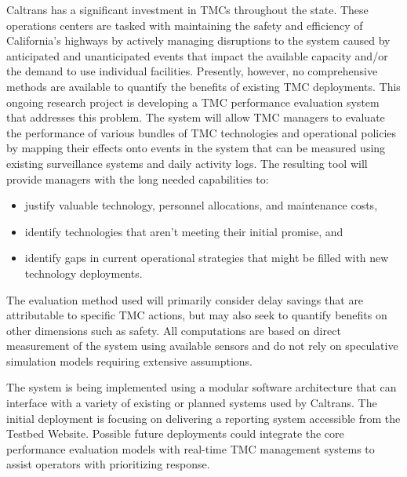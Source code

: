 \documentclass[12pt]{report}
\begin{document}
Caltrans has a significant investment in TMCs throughout the
state. These operations centers are tasked with maintaining the safety
and efficiency of California's highways by actively managing
disruptions to the system caused by anticipated and unanticipated
events that impact the available capacity and/or the demand to use
individual facilities.  Presently, however, no comprehensive methods
are available to quantify the benefits of existing TMC
deployments. This ongoing research project is developing a TMC
performance evaluation system that addresses this problem. The system
will allow TMC managers to evaluate the performance of various bundles
of TMC technologies and operational policies by mapping their effects
onto events in the system that can be measured using existing
surveillance systems and daily activity logs. The resulting tool will
provide managers with the long needed capabilities to:
\begin{itemize}
\item justify valuable technology, personnel allocations, and
  maintenance costs,
\item identify technologies that aren't meeting their initial promise,
  and
\item identify gaps in current operational strategies that might be
  filled with new technology deployments.
\end{itemize}
The evaluation method used will primarily consider delay savings that
are attributable to specific TMC actions, but may also seek to
quantify benefits on other dimensions such as safety. All computations
are based on direct measurement of the system using available sensors
and do not rely on speculative simulation models requiring extensive
assumptions.

The system is being implemented using a modular software architecture
that can interface with a variety of existing or planned systems used
by Caltrans. The initial deployment is focusing on delivering a
reporting system accessible from the Testbed Website. Possible future
deployments could integrate the core performance evaluation models
with real-time TMC management systems to assist operators with
prioritizing response.



\end{document}
